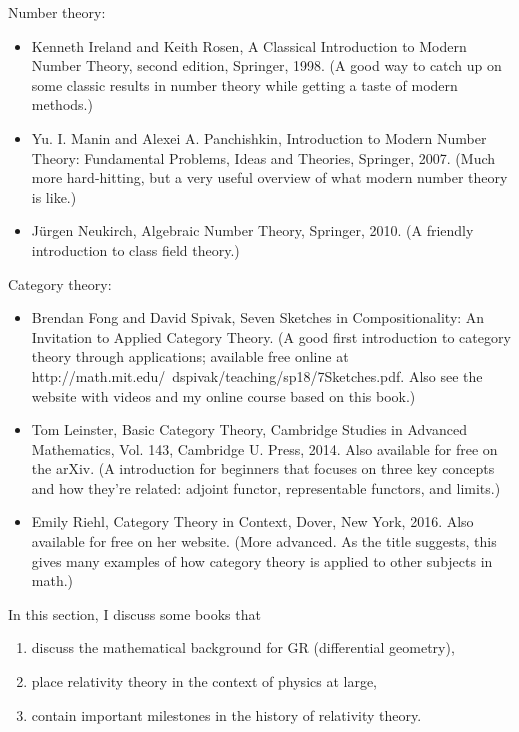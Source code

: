 \documentclass[10pt,a4paper]{book}
\theoremstyle{definition}
\begin{document}
Number theory:

\begin{itemize}
\item Kenneth Ireland and Keith Rosen, A Classical Introduction to Modern Number Theory, second edition, Springer, 1998. (A good way to catch up on some classic results in number theory while getting a taste of modern methods.)
\item Yu. I. Manin and Alexei A. Panchishkin, Introduction to Modern Number Theory: Fundamental Problems, Ideas and Theories, Springer, 2007. (Much more hard-hitting, but a very useful overview of what modern number theory is like.)
\item Jürgen Neukirch, Algebraic Number Theory, Springer, 2010. (A friendly introduction to class field theory.)
\end{itemize}
Category theory:

\begin{itemize}
\item Brendan Fong and David Spivak, Seven Sketches in Compositionality: An Invitation to Applied Category Theory. (A good first introduction to category theory through applications; available free online at http://math.mit.edu/~dspivak/teaching/sp18/7Sketches.pdf. Also see the website with videos and my online course based on this book.)
\item Tom Leinster, Basic Category Theory, Cambridge Studies in Advanced Mathematics, Vol. 143, Cambridge U. Press, 2014. Also available for free on the arXiv. (A introduction for beginners that focuses on three key concepts and how they're related: adjoint functor, representable functors, and limits.)
\item Emily Riehl, Category Theory in Context, Dover, New York, 2016. Also available for free on her website. (More advanced. As the title suggests, this gives many examples of how category theory is applied to other subjects in math.)
\end{itemize}

\newpage
In this section, I discuss some books that
\begin{enumerate}
\item discuss the mathematical background for GR (differential geometry),
\item place relativity theory in the context of physics at large,
\item contain important milestones in the history of relativity theory.
\end{enumerate}
\end{document}
